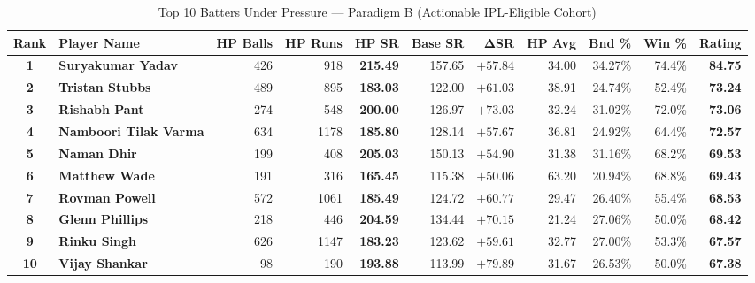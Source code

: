 \documentclass[11pt,a4paper]{article}
\begin{document}
\begin{table}[t]
\centering
\small
\caption{Top 10 Batters Under Pressure --- Paradigm B (Actionable IPL-Eligible Cohort)}
\label{tab:top10_batters_ipl}
\begin{tabularx}{\textwidth}{c l r r r r r r r r r}
\toprule
\textbf{Rank} & \textbf{Player Name} & \textbf{HP Balls} & \textbf{HP Runs} & \textbf{HP SR} & \textbf{Base SR} & $\mathbf{\Delta}$\textbf{SR} & \textbf{HP Avg} & \textbf{Bnd \%} & \textbf{Win \%} & \textbf{Rating} \\
\midrule
\textbf{1} & \textbf{Suryakumar Yadav} & 426 & 918 & \textbf{215.49} & 157.65 & $+57.84$ & 34.00 & 34.27\% & 74.4\% & \textbf{84.75} \\
\textbf{2} & \textbf{Tristan Stubbs} & 489 & 895 & \textbf{183.03} & 122.00 & $+61.03$ & 38.91 & 24.74\% & 52.4\% & \textbf{73.24} \\
\textbf{3} & \textbf{Rishabh Pant} & 274 & 548 & \textbf{200.00} & 126.97 & $+73.03$ & 32.24 & 31.02\% & 72.0\% & \textbf{73.06} \\
\textbf{4} & \textbf{Namboori Tilak Varma} & 634 & 1178 & \textbf{185.80} & 128.14 & $+57.67$ & 36.81 & 24.92\% & 64.4\% & \textbf{72.57} \\
\textbf{5} & \textbf{Naman Dhir} & 199 & 408 & \textbf{205.03} & 150.13 & $+54.90$ & 31.38 & 31.16\% & 68.2\% & \textbf{69.53} \\
\textbf{6} & \textbf{Matthew Wade} & 191 & 316 & \textbf{165.45} & 115.38 & $+50.06$ & 63.20 & 20.94\% & 68.8\% & \textbf{69.43} \\
\textbf{7} & \textbf{Rovman Powell} & 572 & 1061 & \textbf{185.49} & 124.72 & $+60.77$ & 29.47 & 26.40\% & 55.4\% & \textbf{68.53} \\
\textbf{8} & \textbf{Glenn Phillips} & 218 & 446 & \textbf{204.59} & 134.44 & $+70.15$ & 21.24 & 27.06\% & 50.0\% & \textbf{68.42} \\
\textbf{9} & \textbf{Rinku Singh} & 626 & 1147 & \textbf{183.23} & 123.62 & $+59.61$ & 32.77 & 27.00\% & 53.3\% & \textbf{67.57} \\
\textbf{10} & \textbf{Vijay Shankar} & 98 & 190 & \textbf{193.88} & 113.99 & $+79.89$ & 31.67 & 26.53\% & 50.0\% & \textbf{67.38} \\
\bottomrule
\end{tabularx}
\end{table}
\end{document}
